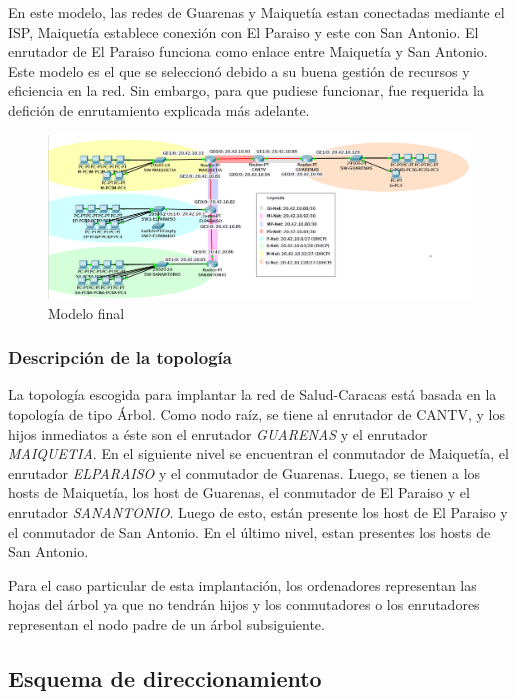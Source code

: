\documentclass[]{article}
\begin{document}
En este modelo, las redes de Guarenas y Maiquetía estan conectadas
mediante el ISP, Maiquetía establece conexión con El Paraiso y este con
San Antonio. El enrutador de El Paraiso funciona como enlace entre
Maiquetía y San Antonio. Este modelo es el que se seleccionó debido a su
buena gestión de recursos y eficiencia en la red. Sin embargo, para que
pudiese funcionar, fue requerida la defición de enrutamiento explicada
más adelante.

\begin{figure}[htbp]
\centering
\includegraphics{ModeloFinal.png}
\caption{Modelo final}
\end{figure}

\newpage

\subsubsection{Descripción de la
topología}\label{descripciuxf3n-de-la-topologuxeda}

La topología escogida para implantar la red de Salud-Caracas está basada
en la topología de tipo Árbol. Como nodo raíz, se tiene al enrutador de
CANTV, y los hijos inmediatos a éste son el enrutador \emph{GUARENAS} y
el enrutador \emph{MAIQUETIA}. En el siguiente nivel se encuentran el
conmutador de Maiquetía, el enrutador \emph{ELPARAISO} y el conmutador
de Guarenas. Luego, se tienen a los hosts de Maiquetía, los host de
Guarenas, el conmutador de El Paraiso y el enrutador \emph{SANANTONIO}.
Luego de esto, están presente los host de El Paraiso y el conmutador de
San Antonio. En el último nivel, estan presentes los hosts de San
Antonio.

Para el caso particular de esta implantación, los ordenadores
representan las hojas del árbol ya que no tendrán hijos y los
conmutadores o los enrutadores representan el nodo padre de un árbol
subsiguiente.

\subsection{Esquema de
direccionamiento}\label{esquema-de-direccionamiento}
\end{document}

